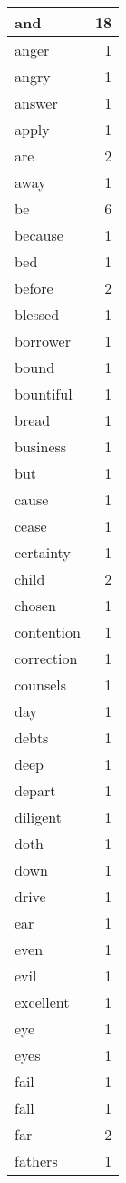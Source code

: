 \begin{center}
\begin{longtable}{l|r}
and & 18\\ \hline 
anger & 1\\ \hline 
angry & 1\\ \hline 
answer & 1\\ \hline 
apply & 1\\ \hline 
are & 2\\ \hline 
away & 1\\ \hline 
be & 6\\ \hline 
because & 1\\ \hline 
bed & 1\\ \hline 
before & 2\\ \hline 
blessed & 1\\ \hline 
borrower & 1\\ \hline 
bound & 1\\ \hline 
bountiful & 1\\ \hline 
bread & 1\\ \hline 
business & 1\\ \hline 
but & 1\\ \hline 
cause & 1\\ \hline 
cease & 1\\ \hline 
certainty & 1\\ \hline 
child & 2\\ \hline 
chosen & 1\\ \hline 
contention & 1\\ \hline 
correction & 1\\ \hline 
counsels & 1\\ \hline 
day & 1\\ \hline 
debts & 1\\ \hline 
deep & 1\\ \hline 
depart & 1\\ \hline 
diligent & 1\\ \hline 
doth & 1\\ \hline 
down & 1\\ \hline 
drive & 1\\ \hline 
ear & 1\\ \hline 
even & 1\\ \hline 
evil & 1\\ \hline 
excellent & 1\\ \hline 
eye & 1\\ \hline 
eyes & 1\\ \hline 
fail & 1\\ \hline 
fall & 1\\ \hline 
far & 2\\ \hline 
fathers & 1\\ \hline 

\end{longtable}
\end{center}
